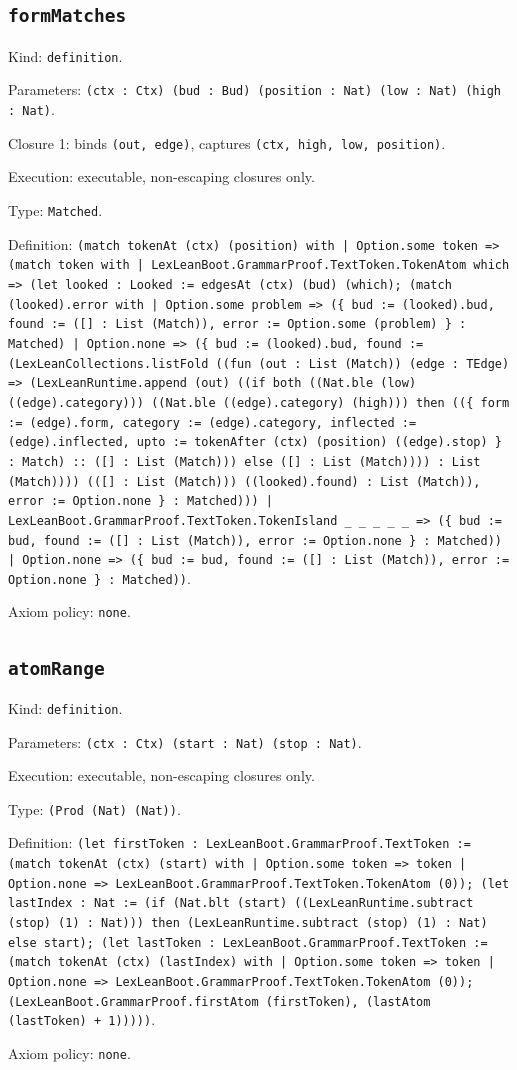 \documentclass[11pt]{article}
\begin{document}
\subsection*{\texttt{formMatches}}
\noindent Kind: \texttt{definition}.\par
\noindent Parameters: \texttt{(ctx : Ctx) (bud : Bud) (position : Nat) (low : Nat) (high : Nat)}.\par
\noindent Closure 1: binds \texttt{(out, edge)}, captures \texttt{(ctx, high, low, position)}.\par
\noindent Execution: executable, non-escaping closures only.\par
\noindent Type: \texttt{Matched}.\par
\noindent Definition: \texttt{(match tokenAt (ctx) (position) with | Option.some token => (match token with | LexLeanBoot.GrammarProof.TextToken.TokenAtom which => (let looked : Looked := edgesAt (ctx) (bud) (which); (match (looked).error with | Option.some problem => (\{ bud := (looked).bud, found := ([] : List (Match)), error := Option.some (problem) \} : Matched) | Option.none => (\{ bud := (looked).bud, found := (LexLeanCollections.listFold ((fun (out : List (Match)) (edge : TEdge) => (LexLeanRuntime.append (out) ((if both ((Nat.ble (low) ((edge).category))) ((Nat.ble ((edge).category) (high))) then ((\{ form := (edge).form, category := (edge).category, inflected := (edge).inflected, upto := tokenAfter (ctx) (position) ((edge).stop) \} : Match) :: ([] : List (Match))) else ([] : List (Match)))) : List (Match)))) (([] : List (Match))) ((looked).found) : List (Match)), error := Option.none \} : Matched))) | LexLeanBoot.GrammarProof.TextToken.TokenIsland \_ \_ \_ \_ \_ => (\{ bud := bud, found := ([] : List (Match)), error := Option.none \} : Matched)) | Option.none => (\{ bud := bud, found := ([] : List (Match)), error := Option.none \} : Matched))}.\par
\noindent Axiom policy: \texttt{none}.\par
\subsection*{\texttt{atomRange}}
\noindent Kind: \texttt{definition}.\par
\noindent Parameters: \texttt{(ctx : Ctx) (start : Nat) (stop : Nat)}.\par
\noindent Execution: executable, non-escaping closures only.\par
\noindent Type: \texttt{(Prod (Nat) (Nat))}.\par
\noindent Definition: \texttt{(let firstToken : LexLeanBoot.GrammarProof.TextToken := (match tokenAt (ctx) (start) with | Option.some token => token | Option.none => LexLeanBoot.GrammarProof.TextToken.TokenAtom (0)); (let lastIndex : Nat := (if (Nat.blt (start) ((LexLeanRuntime.subtract (stop) (1) : Nat))) then (LexLeanRuntime.subtract (stop) (1) : Nat) else start); (let lastToken : LexLeanBoot.GrammarProof.TextToken := (match tokenAt (ctx) (lastIndex) with | Option.some token => token | Option.none => LexLeanBoot.GrammarProof.TextToken.TokenAtom (0)); (LexLeanBoot.GrammarProof.firstAtom (firstToken), (lastAtom (lastToken) + 1)))))}.\par
\noindent Axiom policy: \texttt{none}.\par
\end{document}
